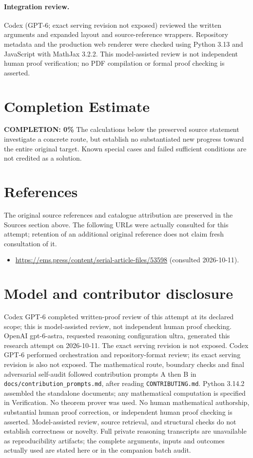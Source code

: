 \documentclass[11pt]{article}
\begin{document}
\paragraph{Integration review.} Codex (GPT-6; exact serving revision not exposed) reviewed the written arguments and expanded layout and source-reference wrappers. Repository metadata and the production web renderer were checked using Python 3.13 and JavaScript with MathJax 3.2.2. This model-assisted review is not independent human proof verification; no PDF compilation or formal proof checking is asserted.

\section{Completion Estimate}
\noindent\textbf{COMPLETION: 0\%}
The calculations below the preserved source statement investigate a concrete route,
but establish no substantiated new progress toward the entire original target.
Known special cases and failed sufficient conditions are not credited as a solution.
\section{References}
The original source references and catalogue attribution are preserved in the
Sources section above. The following URLs were actually consulted for this attempt;
retention of an additional original reference does not claim fresh consultation of it.
\begin{itemize}
\item \url{https://ems.press/content/serial-article-files/53598} (consulted 2026-10-11). 
\end{itemize}
\section{Model and contributor disclosure}
Codex GPT-6 completed written-proof review of this attempt at its declared scope; this is model-assisted review, not independent human proof checking.
OpenAI gpt-6-astra, requested reasoning configuration ultra, generated this research
attempt on 2026-10-11. The exact serving revision is not exposed. Codex GPT-6
performed orchestration and repository-format review; its exact serving revision
is also not exposed. The mathematical route, boundary checks and final adversarial
self-audit followed contribution prompts A then B in
\texttt{docs/contribution\_prompts.md}, after reading \texttt{CONTRIBUTING.md}.
Python 3.14.2 assembled the standalone documents; any mathematical computation is
specified in Verification. No theorem prover was used. No human mathematical
authorship, substantial human proof correction, or independent human proof checking
is asserted. Model-assisted review, source retrieval, and structural checks do not
establish correctness or novelty. Full private reasoning transcripts are unavailable
as reproducibility artifacts; the complete arguments, inputs and outcomes actually
used are stated here or in the companion batch audit.
\end{document}
